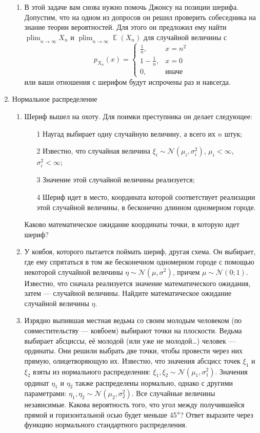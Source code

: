 \documentclass[11pt, a4paper]{article}
\DeclareMathOperator*\plim{plim}
\DeclareMathOperator{\E}{\mathbb{E}}
\newcommand{\cN}{\mathcal{N}}
\theoremstyle{definition}
\begin{document}
\begin{enumerate}
\begin{enumerate}
    \item В этой задаче вам снова нужно помочь Джонсу на позиции шерифа. Допустим, что на одном из допросов он решил проверить собеседника на знание теории вероятностей. Для этого он предложил ему найти $\plim_{n \to \infty}{X_{n}}$ и $\plim_{n \to \infty}{\E (X_{n})} $ для случайной величины с 
\[
p_{X_n}(x) = \begin{cases}
\frac{1}{n},  & x=n^2 \\
1 - \frac{1}{n}, & x=0 \\
0, & \text{иначе}
\end{cases}
\]
или ваши отношения с шерифом будут испрочены раз и навсегда.
\end{enumerate}    

\item Нормальное распределение
\begin{enumerate}
    \item Шериф вышел на охоту. Для поимки преступника он делает следующее: \begin{itemize}
        \item[1] Наугад выбирает одну случайную величину, а всего их $n$ штук;
        \item[2] Известно, что случайная величина $\xi_i\sim \cN(\mu_i, \sigma_i^2)$, $\mu_i<\infty$, $\sigma^2_i <\infty$;
        \item[3] Значение этой случайной величины реализуется;
        \item[4] Шериф идет в место, координата которой соответствует реализации этой случайной величины, в бесконечно длинном одномерном городе. 
    \end{itemize}
    
    Каково математическое ожидание координаты точки, в которую идет шериф?
    
    \item У ковбоя, которого пытается поймать шериф, другая схема. Он выбирает, где ему спрятаться в том же бесконечном одномерном городе с помощью некоторой случайной величины $\eta\sim \cN(\mu, \sigma^2)$, причем $\mu\sim \cN(0; 1)$. Известно, что сначала реализуется значение математического ожидания, затем — случайной величины. Найдите математическое ожидание случайной величины $\eta$.%
    
    \item Изрядно выпившая местная ведьма со своим молодым человеком (по совместительству — ковбоем) выбирают точки на плоскости. Ведьма выбирает абсциссы, её молодой (или уже не молодой\ldots) человек — ординаты. Они решили выбрать две точки, чтобы провести через них прямую, олицетворяющую их. Известно, что значения абсцисс точек $\xi_1$ и $\xi_2$ взяты из нормального распределения: $\xi_1, \xi_2\sim \cN(\mu_1, \sigma_1^2)$. Значения ординат $\eta_1$ и $\eta_2$ также распределены нормально, однако с другими параметрами: $\eta_1, \eta_2\sim \cN(\mu_2, \sigma_2^2)$. Все случайные величины независимые. Какова вероятность того, что угол между получившейся прямой и горизонтальной осью будет меньше 45$\degree$? Ответ выразите через функцию нормального стандартного распределения.
    

\end{enumerate}
\end{enumerate}
\end{document}
